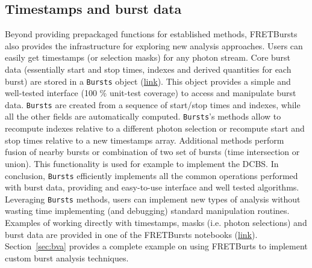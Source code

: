 \subsection{Timestamps and burst data}
\label{sec:burststimes}

Beyond providing prepackaged functions for established methods, 
FRETBursts also provides the infrastructure for exploring new analysis approaches.
Users can easily get timestamps (or selection masks) for any photon stream.
Core burst data (essentially start and stop times, indexes 
and derived quantities for each burst) are stored in a \verb|Bursts| object 
(\href{http://fretbursts.readthedocs.org/en/latest/burstsearch.html}{link}).
This object provides a simple and well-tested interface (100 \% unit-test coverage) 
to access and manipulate burst data. \verb|Bursts| are created from a sequence of start/stop 
times and indexes, while all the other fields are automatically
computed. \verb|Bursts|'s methods allow to recompute indexes relative to a different photon
selection or recompute start and stop times relative to a new timestamps array.
Additional methods perform fusion of nearby bursts or combination of two set of bursts 
(time intersection or union). This functionality is used for example to implement 
the DCBS.
In conclusion, \verb|Bursts| efficiently implements all the common operations performed 
with burst data, providing and easy-to-use interface and well tested algorithms. 
Leveraging \verb|Bursts| methods, users can implement new types of analysis without 
wasting time implementing (and debugging) standard manipulation routines.
Examples of working directly with timestamps, masks (i.e. photon selections) and 
burst data are provided in one of the FRETBursts notebooks (\href{http://nbviewer.jupyter.org/github/tritemio/FRETBursts_notebooks/blob/master/notebooks/Example%20-%20Working%20with%20timestamps%20and%20bursts.ipynb}{link}). 
Section~\ref{sec:bva} provides a complete example on using FRETBurts to implement 
custom burst analysis techniques.

